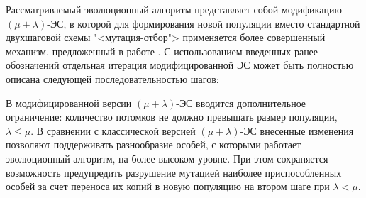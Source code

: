 \documentclass[12pt]{article}
\begin{document}
Рассматриваемый эволюционный алгоритм представляет собой модификацию 
$(\mu + \lambda)$-ЭС, в которой для формирования новой популяции вместо 
стандартной двухшаговой схемы "<мутация-отбор"> применяется более совершенный 
механизм, предложенный в работе 
\cite[с.~62]{michalewicz98}. 
С использованием введенных ранее 
обозначений отдельная итерация модифицированной ЭС может быть полностью 
описана следующей последовательностью шагов:

В модифицированной версии $(\mu + \lambda)$-ЭС вводится дополнительное 
ограничение: количество потомков не должно превышать размер популяции, 
$\lambda \leq \mu$. В сравнении с классической версией $(\mu + \lambda)$-ЭС 
внесенные изменения позволяют поддерживать разнообразие особей, с которыми 
работает эволюционный алгоритм, на более высоком уровне. При этом сохраняется 
возможность предупредить разрушение мутацией наиболее приспособленных особей 
за счет переноса их копий в новую популяцию на втором шаге при $\lambda<\mu$.
\end{document}
